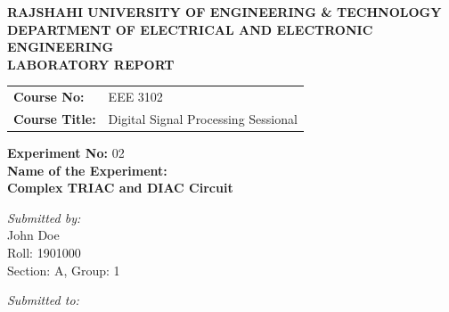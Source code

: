 \documentclass[12pt,a4paper]{article}
\begin{document}
\begin{titlepage}
    \sffamily
    \centering
    \vspace*{1cm}
    
    \Large \textbf{\MakeUppercase{ Rajshahi University of Engineering \& Technology }} \\
    \vspace{0.5cm}
    \large \textbf{\MakeUppercase{ Department of Electrical and Electronic Engineering }} \\
    
    \vspace{2.5cm}
    \Large \textbf{LABORATORY REPORT} \\
    \vspace{1cm}
    
    \begin{tabular}{ll}
        \textbf{Course No:} & EEE 3102 \\
        \textbf{Course Title:} & Digital Signal Processing Sessional \\
    \end{tabular}
    
    \vspace{2cm}
    
    \textbf{Experiment No:} 02 \\
    \vspace{0.5cm}
    \textbf{Name of the Experiment:} \\
    \Large \textbf{ Complex TRIAC and DIAC Circuit } \\
    
    \vspace{2.5cm}
    
    \begin{minipage}[t]{0.4\textwidth}
        \begin{flushleft} \large
            \emph{Submitted by:}\\
            John Doe \\
            Roll: 1901000 \\
            Section: A, Group: 1
        \end{flushleft}
    \end{minipage}
    \hfill
    \begin{minipage}[t]{0.5\textwidth}
        \begin{flushright} \large
            \emph{Submitted to:} \\
            

\end{flushright}
\end{minipage}
\end{titlepage}
\end{document}
